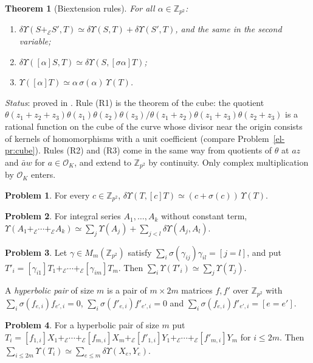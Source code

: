 \documentclass[reqno]{amsart}
\theoremstyle{definition}
\newtheorem{problem}{Problem}[section]
\theoremstyle{plain}
\newtheorem{theorem}{Theorem}[section]
\theoremstyle{remark}
\newcommand{\Z}{\mathbb Z}
\newcommand{\Oc}{\mathcal O}
\newcommand{\Ec}{\mathcal E}
\newcommand{\pe}{+_{\Ec}}
\begin{document}
\begin{theorem}[Biextension rules]\label{thm:rules}
For all \(\alpha\in\Z_{p^2}\):
\begin{enumerate}
\item[(R1)] \(\delta\Upsilon(S\pe S',T)\simeq\delta\Upsilon(S,T)+\delta\Upsilon(S',T)\), and the same in the second variable;
\item[(R2)] \(\delta\Upsilon([\alpha]S,T)\simeq\delta\Upsilon(S,[\sigma\alpha]T)\);
\item[(R3)] \(\Upsilon([\alpha]T)\simeq\alpha\,\sigma(\alpha)\,\Upsilon(T)\).
\end{enumerate}
\end{theorem}
\noindent\emph{Status}: proved in \cite[Props.~8.9, 8.10 and Lemma~8.13]{Adr}.  Rule (R1) is the theorem of the cube: the quotient \(\theta(z_1+z_2+z_3)\theta(z_1)\theta(z_2)\theta(z_3)/\theta(z_1+z_2)\theta(z_1+z_3)\theta(z_2+z_3)\) is a rational function on the cube of the curve whose divisor near the origin consists of kernels of homomorphisms with a unit coefficient (compare Problem~\ref{el-pr:cube}).  Rules (R2) and (R3) come in the same way from quotients of \(\theta\) at \(az\) and \(\bar aw\) for \(a\in\Oc_K\), and extend to \(\Z_{p^2}\) by continuity.  Only complex multiplication by \(\Oc_K\) enters.

\begin{problem}\label{pr:diag}
For every \(c\in\Z_{p^2}\), \(\delta\Upsilon(T,[c]T)\simeq(c+\sigma(c))\,\Upsilon(T)\).
\end{problem}

\begin{problem}\label{pr:upssum}
For integral series \(A_1,\dots,A_k\) without constant term,
\(\Upsilon(A_1\pe\cdots\pe A_k)\simeq\sum_j\Upsilon(A_j)+\sum_{j<l}\delta\Upsilon(A_j,A_l)\).
\end{problem}

\begin{problem}\label{pr:unitary}
Let \(\gamma\in M_m(\Z_{p^2})\) satisfy \(\sum_i\sigma(\gamma_{ij})\gamma_{il}=[j=l]\), and put \(T'_i=[\gamma_{i1}]T_1\pe\cdots\pe[\gamma_{im}]T_m\).  Then \(\sum_i\Upsilon(T'_i)\simeq\sum_j\Upsilon(T_j)\).
\end{problem}

A \emph{hyperbolic pair} of size \(m\) is a pair of \(m\times2m\) matrices \(f,f'\) over \(\Z_{p^2}\) with
\(\sum_i\sigma(f_{e,i})f_{e',i}=0\), \(\sum_i\sigma(f'_{e,i})f'_{e',i}=0\) and \(\sum_i\sigma(f_{e,i})f'_{e',i}=[e=e']\).

\begin{problem}\label{pr:hypshape}
For a hyperbolic pair of size \(m\) put \(T_i=[f_{1,i}]X_1\pe\cdots\pe[f_{m,i}]X_m\pe[f'_{1,i}]Y_1\pe\cdots\pe[f'_{m,i}]Y_m\) for \(i\le2m\).  Then \(\sum_{i\le2m}\Upsilon(T_i)\simeq\sum_{e\le m}\delta\Upsilon(X_e,Y_e)\).
\end{problem}
\end{document}
